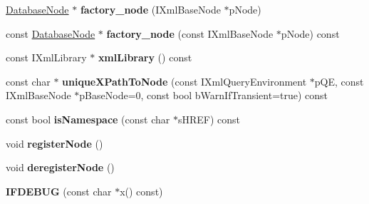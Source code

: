\begin{DoxyCompactItemize}
\item 
\hypertarget{classgeneral__server_1_1DatabaseNode_a6d0c7ad02eb3655d11e8be40b598bb7d}{\hyperlink{classgeneral__server_1_1DatabaseNode}{\-Database\-Node} $\ast$ {\bfseries factory\-\_\-node} (\-I\-Xml\-Base\-Node $\ast$p\-Node)}\label{classgeneral__server_1_1DatabaseNode_a6d0c7ad02eb3655d11e8be40b598bb7d}

\item 
\hypertarget{classgeneral__server_1_1DatabaseNode_a32263ac9739b062dfc142bf3ad717b4a}{const \hyperlink{classgeneral__server_1_1DatabaseNode}{\-Database\-Node} $\ast$ {\bfseries factory\-\_\-node} (const \-I\-Xml\-Base\-Node $\ast$p\-Node) const }\label{classgeneral__server_1_1DatabaseNode_a32263ac9739b062dfc142bf3ad717b4a}

\item 
\hypertarget{classgeneral__server_1_1DatabaseNode_a3d2a6dd10ecd0a72c81f6c1d962a72b5}{const \-I\-Xml\-Library $\ast$ {\bfseries xml\-Library} () const }\label{classgeneral__server_1_1DatabaseNode_a3d2a6dd10ecd0a72c81f6c1d962a72b5}

\item 
\hypertarget{classgeneral__server_1_1DatabaseNode_a5f0b9f5f6bfb92c0d821313fa89935e8}{const char $\ast$ {\bfseries unique\-X\-Path\-To\-Node} (const \-I\-Xml\-Query\-Environment $\ast$p\-Q\-E, const \-I\-Xml\-Base\-Node $\ast$p\-Base\-Node=0, const bool b\-Warn\-If\-Transient=true) const }\label{classgeneral__server_1_1DatabaseNode_a5f0b9f5f6bfb92c0d821313fa89935e8}

\item 
\hypertarget{classgeneral__server_1_1DatabaseNode_a100df68e98fbe7478828c9891a6595aa}{const bool {\bfseries is\-Namespace} (const char $\ast$s\-H\-R\-E\-F) const }\label{classgeneral__server_1_1DatabaseNode_a100df68e98fbe7478828c9891a6595aa}

\item 
\hypertarget{classgeneral__server_1_1DatabaseNode_ae71c471f811033248e9c9f709419c690}{void {\bfseries register\-Node} ()}\label{classgeneral__server_1_1DatabaseNode_ae71c471f811033248e9c9f709419c690}

\item 
\hypertarget{classgeneral__server_1_1DatabaseNode_a95c89b830613b28dc0a16f7a7083599d}{void {\bfseries deregister\-Node} ()}\label{classgeneral__server_1_1DatabaseNode_a95c89b830613b28dc0a16f7a7083599d}

\item 
\hypertarget{classgeneral__server_1_1DatabaseNode_af5cc5d68acbda2a399cc8228b44e41b4}{{\bfseries \-I\-F\-D\-E\-B\-U\-G} (const char $\ast$x() const)}\label{classgeneral__server_1_1DatabaseNode_af5cc5d68acbda2a399cc8228b44e41b4}


\end{DoxyCompactItemize}
